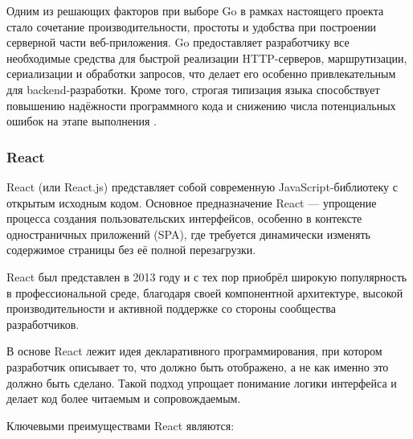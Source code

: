 \documentclass[diploma]{SCWorks}
\begin{document}
Одним из решающих факторов при выборе Go в рамках настоящего 
проекта стало сочетание производительности, простоты и удобства при 
построении серверной части веб-приложения. Go предоставляет разработчику все 
необходимые средства для быстрой реализации HTTP-серверов, маршрутизации, 
сериализации и обработки запросов, что делает его особенно привлекательным 
для backend-разработки. Кроме того, строгая типизация языка способствует 
повышению надёжности программного кода и снижению числа потенциальных ошибок 
на этапе выполнения \cite{go-docs,go-by-example}.

\subsubsection{React}

React (или React.js) представляет собой современную JavaScript-библиотеку с 
открытым исходным кодом. Основное предназначение React — упрощение процесса 
создания пользовательских интерфейсов, особенно в контексте одностраничных 
приложений (SPA), где требуется динамически изменять содержимое страницы без 
её полной перезагрузки.

React был представлен в 2013 году и с тех пор приобрёл широкую популярность 
в профессиональной среде, благодаря своей компонентной архитектуре, высокой 
производительности и активной поддержке со стороны сообщества разработчиков.

В основе React лежит идея декларативного программирования, при котором 
разработчик описывает то, что должно быть отображено, а не как именно это 
должно быть сделано. Такой подход упрощает понимание логики интерфейса и 
делает код более читаемым и сопровождаемым.

Ключевыми преимуществами React являются:
\end{document}
